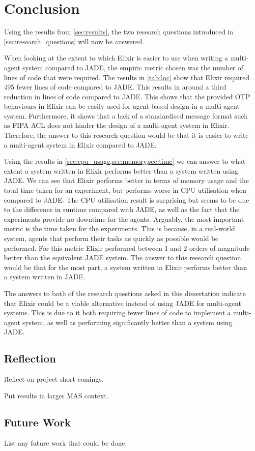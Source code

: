 \section{Conclusion}

Using the results from \cref{sec:results}, the two research questions introduced in \cref{sec:research_questions} will now be answered.

When looking at the extent to which Elixir is easier to use when writing a multi-agent system compared to JADE, the empiric metric chosen was the number of lines of code that were required.
The results in \cref{tab:loc} show that Elixir required 495 fewer lines of code compared to JADE\@.
This results in around a third reduction in lines of code compared to JADE\@.
This shows that the provided OTP behaviours in Elixir can be easily used for agent-based design in a multi-agent system.
Furthermore, it shows that a lack of a standardised message format such as FIPA ACL does not hinder the design of a multi-agent system in Elixir.
Therefore, the answer to this research question would be that it is easier to write a multi-agent system in Elixir compared to JADE\@.

Using the results in \cref{sec:cpu_usage,sec:memory,sec:time} we can answer to what extent a system written in Elixir performs better than a system written using JADE\@.
We can see that Elixir performs better in terms of memory usage and the total time taken for an experiment, but performs worse in CPU utilisation when compared to JADE\@.
The CPU utilisation result is surprising but seems to be due to the difference in runtime compared with JADE, as well as the fact that the experiments provide no downtime for the agents.
Arguably, the most important metric is the time taken for the experiments.
This is because, in a real-world system, agents that perform their tasks as quickly as possible would be performed.
For this metric Elixir performed between 1 and 2 orders of magnitude better than the equivalent JADE system.
The answer to this research question would be that for the most part, a system written in Elixir performs better than a system written in JADE\@.

The answers to both of the research questions asked in this dissertation indicate that Elixir could be a viable alternative instead of using JADE for multi-agent systems.
This is due to it both requiring fewer lines of code to implement a multi-agent system, as well as performing significantly better than a system using JADE\@.

\subsection{Reflection}

Reflect on project short comings.

Put results in larger MAS context.

\subsection{Future Work}

List any future work that could be done.
